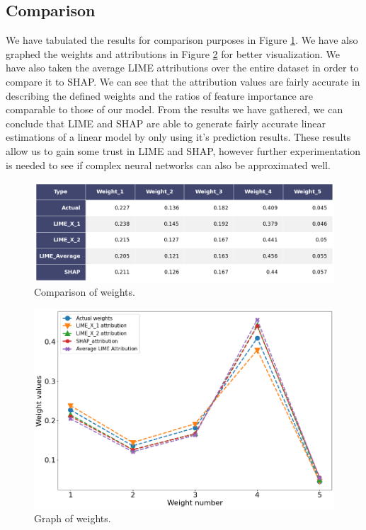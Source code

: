 \subsection{Comparison}
We have tabulated the results for comparison purposes in Figure \ref{fig:weight-tab}. We have also graphed the weights and attributions in Figure \ref{fig:weight-graph} for better visualization. We have also taken the average LIME attributions over the entire dataset in order to compare it to SHAP. We can see that the attribution values are fairly accurate in describing the defined weights and the ratios of feature importance are comparable to those of our model. From the results we have gathered, we can conclude that LIME and SHAP are able to generate fairly accurate linear estimations of a linear model by only using it's prediction results. These results allow us to gain some trust in LIME and SHAP, however further experimentation is needed to see if complex neural networks can also be approximated well.
\begin  {figure}[!htpb]
  \includegraphics[width=\linewidth]{Evaluation_Images/weight_table.png}
   \caption{Comparison of weights.}
    \label{fig:weight-tab}
\end{figure}

\begin  {figure}[!htpb]
  \includegraphics[width=\linewidth]{Evaluation_Images/weight_comp.png}
   \caption{Graph of weights.}
    \label{fig:weight-graph}
\end{figure}

